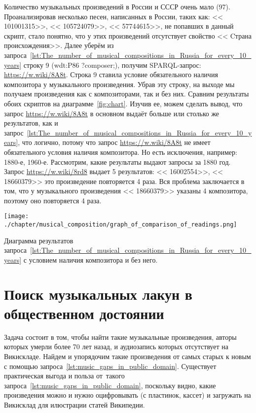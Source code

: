 Количество музыкальных произведений в России и СССР очень мало (97). Проанализировав несколько песен, написанных в России, таких как: << {101001315}>>, << {105724079}>>, << {57744615}>>, не попавших в данный скрипт, стало понятно, что у этих произведений отсутствует свойство << {Cтрана происхождения}>>.
Далее уберём из запроса~\ref{lst:The_number_of_musical_compositions_in_Russia_for_every_10_years} строку 9 (wdt:P86 ?composer;), получим SPARQL-запрос: \href{https://w.wiki/8A8t}{https://w.wiki/8A8t}. Строка 9 ставила условие обязательного наличия композитора у музыкального произведения. Убрав эту строку, на выходе мы получаем произведения как с композиторами, так и без них. Сравним результаты обоих скриптов на диаграмме~\ref{fig:chart}. Изучив ее, можем сделать вывод, что запрос \href{https://w.wiki/8A8t}{https://w.wiki/8A8t} в основном выдаёт больше или столько же результатов, как и запрос~\ref{lst:The_number_of_musical_compositions_in_Russia_for_every_10_years}, что логично, потому что запрос \href{https://w.wiki/8A8t}{https://w.wiki/8A8t} не имеет обязательного условия наличия композитора. Но есть исключения, например: 1880-е, 1960-е. Рассмотрим, какие результаты выдают запросы за 1880 год. Запрос \href{https://w.wiki/8rd8}{https://w.wiki/8rd8} выдает 5 результатов: << {16002554}>>, << {18660379}>> это произведение повторяется 4 раза. Вся проблема заключается в том, что у музыкального произведения  << {18660379}>> указаны 4 композитора, поэтому оно повторяется 4 раза.

\begin{marginfigure}[0\baselineskip]
	\texttt{[image: ./chapter/musical\_composition/graph\_of\_comparison\_of\_readings.png]}
	\caption[Диаграмма результатов запроса~\ref{lst:The_number_of_musical_compositions_in_Russia_for_every_10_years} с условием наличия композитора и без него.]{Диаграмма результатов запроса~\ref{lst:The_number_of_musical_compositions_in_Russia_for_every_10_years} с условием наличия композитора и без него.}%
	\label{fig:chart}%
\end{marginfigure}

\section{Поиск музыкальных лакун в общественном достоянии}
Задача состоит в том, чтобы найти такие музыкальные произведения, авторы которых умерли более 70 лет назад, и аудиозапись которых отсутствует на Викискладе. Найдем и упорядочим такие произведения от самых старых к новым с помощью запроса~\ref{lst:music_gaps_in_public_domain}. Существует практическая выгода и польза от~такого запроса~\ref{lst:music_gaps_in_public_domain}, поскольку видно, какие произведения можно и нужно оцифровывать (с пластинок, кассет) и загружать на Викисклад для илюстрации статей Википедии.

